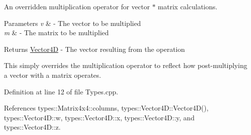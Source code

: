 An overridden multiplication operator for vector $\ast$ matrix calculations. 


\begin{DoxyParams}{Parameters}
{\em v} & -\/ The vector to be multiplied \\
\hline
{\em m} & -\/ The matrix to be multiplied \\
\hline
\end{DoxyParams}
\begin{DoxyReturn}{Returns}
\hyperlink{structtypes_1_1_vector4_d}{Vector4\+D} -\/ The vector resulting from the operation
\end{DoxyReturn}
This simply overrides the multiplication operator to reflect how post-\/multiplying a vector with a matrix operates. 

Definition at line 12 of file Types.\+cpp.



References types\+::\+Matrix4x4\+::columns, types\+::\+Vector4\+D\+::\+Vector4\+D(), types\+::\+Vector4\+D\+::w, types\+::\+Vector4\+D\+::x, types\+::\+Vector4\+D\+::y, and types\+::\+Vector4\+D\+::z.


